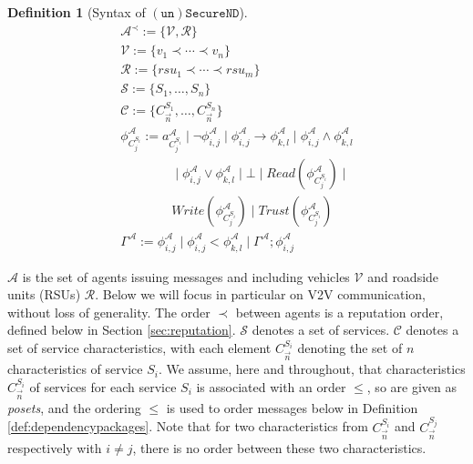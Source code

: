 \documentclass[compsoc, conference, letterpaper, 10pt, times]{IEEEtran}
\newtheorem{definition}{Definition}
\begin{document}
\begin{definition}[Syntax of $\mathtt{(un)SecureND}$]\label{def:syntax} %
	\begin{displaymath}
	\begin{array}{l}
	\mathcal{A}^{\prec}:= \{\mathcal{V, R}\}\\
	\mathcal{V}:= \{v_{1}\prec \cdots \prec v_{n}\}\\
	\mathcal{R}:= \{rsu_{1}\prec\cdots \prec rsu_{m}\}\\
	\mathcal{S}:= \{S_1, \dots, S_{n}\}\\  %
	\mathcal{C}:= \{C^{S_1}_{\overrightarrow{n}},  \dots, C^{S_{n}}_{\overrightarrow{n}}\}\\  %
	\phi^{\mathcal{A}}_{C^{S_{i}}_{j}}:= a^{\mathcal{A}}_{C^{S_{i}}_{j}}\mid \neg \phi^{\mathcal{A}}_{i,j}\mid \phi^{\mathcal{A}}_{i,j}\rightarrow \phi^{\mathcal{A}}_{k,l}\mid \phi^{\mathcal{A}}_{i,j}\wedge \phi^{\mathcal{A}}_{k,l}\\
	\qquad \qquad \mid \phi^{\mathcal{A}}_{i,j}\vee \phi^{\mathcal{A}}_{k,l} \mid \bot \mid Read(\phi^{\mathcal{A}}_{C^{S_{i}}_{j}})\mid\\ 
	\qquad \qquad Write(\phi^{\mathcal{A}}_{C^{S_{i}}_{j}})\mid Trust(\phi^{\mathcal{A}}_{C^{S_{i}}_{j}})\\
	\Gamma^{\mathcal{A}}:= 
	\phi^{\mathcal{A}}_{i,j} \mid \phi^{\mathcal{A}}_{i,j} < \phi^{\mathcal{A}}_{k,l} \mid \Gamma^{\mathcal{A}}; \phi^{\mathcal{A}}_{i,j}
	
	\end{array}
	\end{displaymath}
\end{definition}
%

$\mathcal{A}$ is the set of agents issuing messages and including vehicles $\mathcal{V}$ and roadside units (RSUs) $\mathcal{R}$. Below we will focus in particular on V2V communication, without loss of generality. The order $\prec$ between agents is a reputation order, defined below in Section \ref{sec:reputation}. $\mathcal{S}$ denotes a set of services. $\mathcal{C}$ denotes a set of service characteristics, with each element $C^{S_i}_{\overrightarrow{n}}$ denoting the set of $n$ characteristics of service $S_{i}$. We assume, here and throughout, that characteristics $C^{S_i}_{\overrightarrow{n}}$ of services for each service $S_i$ is associated with an order $\leq$, so are given as \emph{posets}, and the ordering $\leq$ is used to order messages below in Definition \ref{def:dependencypackages}. Note that for two characteristics from $C^{S_i}_{\overrightarrow{n}}$ and $C^{S_j}_{\overrightarrow{n}}$ respectively with $i\neq j$, there is no order between  these two characteristics.
\end{document}
